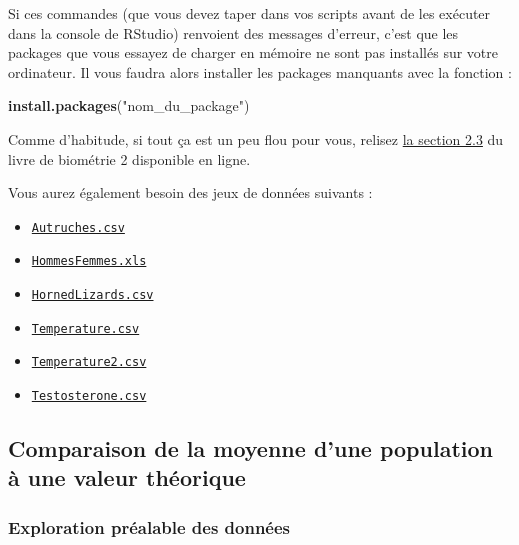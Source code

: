 \documentclass[a4paperpaper,]{article}
\newenvironment{Shaded}{\begin{snugshade}}{\end{snugshade}}
\newcommand{\KeywordTok}[1]{\textcolor[rgb]{0.12,0.11,0.11}{\textbf{#1}}}
\newcommand{\NormalTok}[1]{\textcolor[rgb]{0.12,0.11,0.11}{#1}}
\newcommand{\StringTok}[1]{\textcolor[rgb]{0.75,0.01,0.01}{#1}}
\providecommand{\tightlist}{%
  \setlength{\itemsep}{0pt}\setlength{\parskip}{0pt}}
\begin{document}
Si ces commandes (que vous devez taper dans vos scripts avant de les exécuter dans la console de RStudio) renvoient des messages d'erreur, c'est que les packages que vous essayez de charger en mémoire ne sont pas installés sur votre ordinateur. Il vous faudra alors installer les packages manquants avec la fonction :

\begin{Shaded}
\begin{Highlighting}[]
\KeywordTok{install.packages}\NormalTok{(}\StringTok{"nom_du_package"}\NormalTok{)}
\end{Highlighting}
\end{Shaded}

Comme d'habitude, si tout ça est un peu flou pour vous, relisez \href{https://besibo.github.io/Biometrie2/bases.html\#charger-un-package-en-memoire}{la section 2.3} du livre de biométrie 2 disponible en ligne.

Vous aurez également besoin des jeux de données suivants :

\begin{itemize}
\tightlist
\item
  \href{https://besibo.github.io/Biometrie3/data/Autruches.csv}{\texttt{Autruches.csv}}
\item
  \href{https://besibo.github.io/Biometrie3/data/HommesFemmes.xls}{\texttt{HommesFemmes.xls}}
\item
  \href{https://besibo.github.io/Biometrie3/data/HornedLizards.csv}{\texttt{HornedLizards.csv}}
\item
  \href{https://besibo.github.io/Biometrie3/data/Temperature.csv}{\texttt{Temperature.csv}}
\item
  \href{https://besibo.github.io/Biometrie3/data/Temperature2.csv}{\texttt{Temperature2.csv}}
\item
  \href{https://besibo.github.io/Biometrie3/data/Testosterone.csv}{\texttt{Testosterone.csv}}
\end{itemize}

\hypertarget{comparaison-de-la-moyenne-dune-population-uxe0-une-valeur-thuxe9orique}{%
\subsection{Comparaison de la moyenne d'une population à une valeur théorique}\label{comparaison-de-la-moyenne-dune-population-uxe0-une-valeur-thuxe9orique}}

\hypertarget{Explo}{%
\subsubsection{Exploration préalable des données}\label{Explo}}
\end{document}
